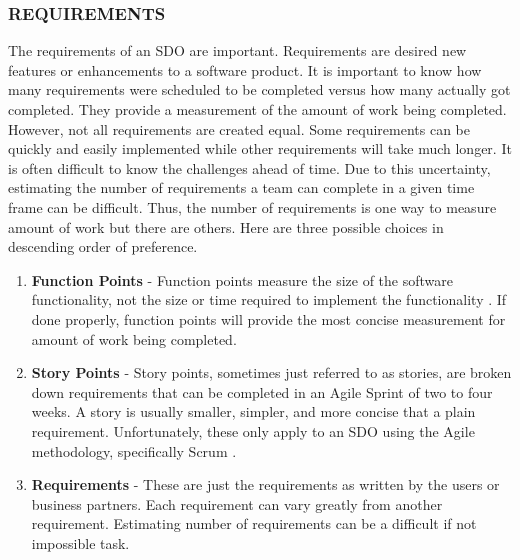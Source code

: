 \documentclass[SDSUThesis.tex]{subfiles}
\begin{document}
        \subsubsection{REQUIREMENTS}
            The requirements of an SDO are important. Requirements are desired 
            new features or enhancements to a software product.  It is important
            to know how many requirements
            were scheduled to be completed versus how many actually got completed. 
            They provide a measurement
            of the amount of work being completed. However, not all requirements
            are created equal.  Some requirements can be quickly and easily
            implemented while other requirements will take much longer.  It
            is often difficult to know the challenges ahead of time.  Due to
            this uncertainty, estimating
            the number of requirements a team can complete in a given time frame can
            be difficult. Thus, the number of requirements is one way to measure 
            amount of work
            but there are others.  Here are three possible choices in descending
            order of preference.
            \begin{enumerate}
                \item \textbf{Function Points} - Function points measure the size of the
                    software functionality, not the size or time required
                    to implement the functionality \cite{Jensen2014}.  
                    If done properly,
                    function points will provide the most concise measurement
                    for amount of work being completed. 
                \item \textbf{Story Points} - Story points, sometimes just referred to 
                    as stories, are broken down requirements that can be
                    completed in an Agile Sprint of two to four weeks.  A 
                    story is usually smaller, simpler, and more concise
                    that a plain requirement. 
                    Unfortunately, these only apply to an
                    SDO using the Agile methodology, specifically 
                    Scrum \cite{Ashmore2014}.
                \item \textbf{Requirements} - These are just the requirements as
                    written by the users or business partners.  Each requirement
                    can vary greatly from another requirement.  Estimating
                    number of requirements can be a difficult if not impossible
                    task.  
            \end{enumerate}
            
\end{document}
